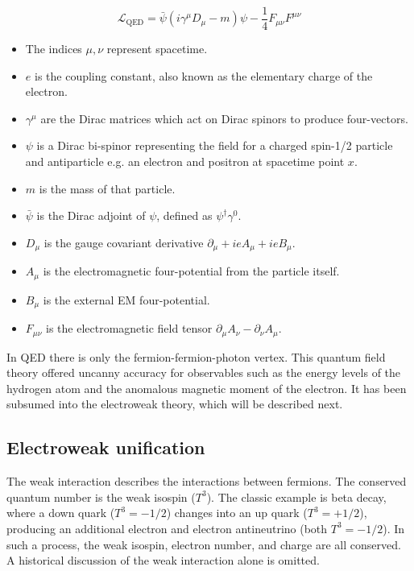 \begin{equation}
\mathcal{L}_\mathrm{QED} = \bar{\psi}\left( i\gamma^\mu D_\mu - m \right) \psi - \frac{1}{4} F_{\mu\nu} F^{\mu\nu}
\end{equation}

\begin{itemize}
  \setlength\itemsep{0em}
  \item The indices $\mu,\nu$ represent spacetime.
  \item $e$ is the coupling constant, also known as the elementary charge of the electron.
  \item $\gamma^\mu$ are the Dirac matrices which act on Dirac spinors to produce four-vectors.
  \item $\psi$ is a Dirac bi-spinor representing the field for a charged spin-1/2 particle and antiparticle e.g. an electron and positron at spacetime point $x$.
  \item $m$ is the mass of that particle.
  \item $\bar{\psi}$ is the Dirac adjoint of $\psi$, defined as $\psi^\dagger \gamma^0$.
  \item $D_\mu$ is the gauge covariant derivative $\partial_\mu + ieA_\mu + ieB_\mu$.
  \item $A_\mu$ is the electromagnetic four-potential from the particle itself.
  \item $B_\mu$ is the external EM four-potential.
  \item $F_{\mu\nu}$ is the electromagnetic field tensor $\partial_\mu A_\nu - \partial_\nu A_\mu$.
\end{itemize}

In QED there is only the fermion-fermion-photon vertex. 
This quantum field theory offered uncanny accuracy for observables such as
the energy levels of the hydrogen atom and the anomalous magnetic moment of the electron.
It has been subsumed into the electroweak theory, which will be described next.

\subsection{Electroweak unification}
\label{electroweak}
The weak interaction describes the interactions between fermions.
The conserved quantum number is the weak isospin ($T^3$).
The classic example is beta decay, where a down quark ($T^3={-}1/2$) changes into an up quark ($T^3=+1/2$),
producing an additional electron and electron antineutrino (both $T^3={-}1/2$). 
In such a process, the weak isospin, electron number, and charge are all conserved.
A historical discussion of the weak interaction alone is omitted.


